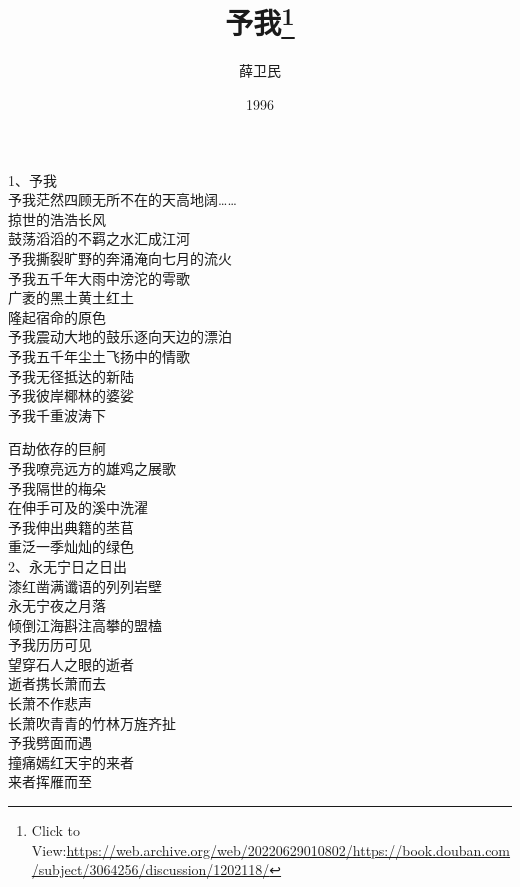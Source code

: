 \documentclass{article}
\title{予我\footnote{Click to View:\url{https://web.archive.org/web/20220629010802/https://book.douban.com/subject/3064256/discussion/1202118/}}}
\author{薛卫民}
\date{1996}
\begin{document}

\maketitle

\setlength\parindent{0pt}


\Large

﻿1、予我
\\
予我茫然四顾无所不在的天高地阔…… \\ 


掠世的浩浩长风\\
鼓荡滔滔的不羁之水汇成江河\\
予我撕裂旷野的奔涌淹向七月的流火
\\
予我五千年大雨中滂沱的雩歌 \\ 


广袤的黑土黄土红土\\
隆起宿命的原色\\
予我震动大地的鼓乐逐向天边的漂泊\\
予我五千年尘土飞扬中的情歌\\
予我无径抵达的新陆\\
予我彼岸椰林的婆娑\\
予我千重波涛下\\
\newpage

百劫依存的巨舸\\
予我嘹亮远方的雄鸡之展歌\\
予我隔世的梅朵\\
在伸手可及的溪中洗濯\\
予我伸出典籍的苤苢
\\
重泛一季灿灿的绿色 \\ 


2、永无宁日之日出\\
漆红凿满谶语的列列岩壁\\
永无宁夜之月落
\\
倾倒江海斟注高攀的盟榼 \\ 


予我历历可见\\
望穿石人之眼的逝者\\
逝者携长萧而去\\
长萧不作悲声
\\
长萧吹青青的竹林万旌齐扯 \\ 


予我劈面而遇\\
撞痛嫣红天宇的来者\\
来者挥雁而至\\
\newpage
\end{document}
